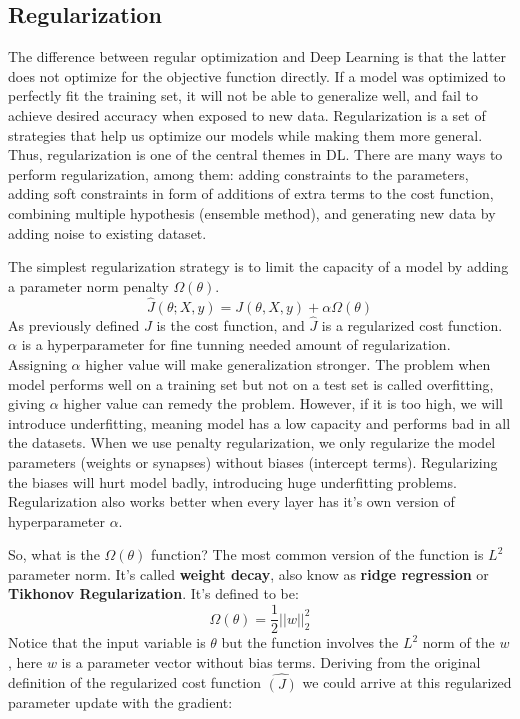 \documentclass[paper=a4, fontsize=11pt]{scrartcl}
\numberwithin{equation}{section}		%
\numberwithin{figure}{section}			%
\numberwithin{table}{section}			%
\begin{document}
	\subsection{Regularization}
	The difference between regular optimization and Deep Learning is that the latter does not optimize for the objective function directly. If a model was optimized to perfectly fit the training set, it will not be able to generalize well, and fail to achieve desired accuracy when exposed to new data. Regularization is a set of strategies that help us optimize our models while making them more general. Thus, regularization is one of the central themes in DL. There are many ways to perform regularization, among them: adding constraints to the parameters, adding soft constraints in form of additions of extra terms to the cost function, combining multiple hypothesis (ensemble method), and generating new data by adding noise to existing dataset.
	\par
	The simplest regularization strategy is to limit the capacity of a model by adding a parameter norm penalty $ \Omega(\theta) $.
	$$ 
	\hat{J}(\theta;X,y) = J(\theta,X,y) + \alpha\Omega(\theta) 
	$$ 
	As previously defined $J$ is the cost function, and $\hat{J}$ is a regularized cost function. $\alpha$ is a hyperparameter for fine tunning needed amount of regularization. Assigning $\alpha$ higher value will make generalization stronger. The problem when model performs well on a training set but not on a test set is called overfitting, giving $\alpha$ higher value can remedy the problem. However, if it is too high, we will introduce underfitting, meaning model has a low capacity and performs bad in all the datasets. When we use penalty regularization, we only regularize the model  parameters (weights or synapses) without biases (intercept terms). Regularizing the biases will hurt model badly, introducing huge underfitting problems. Regularization also works better when every layer has it's own version of hyperparameter $\alpha$. \par
	So, what is the $\Omega(\theta)$ function? The most common version of the function is $L^2$ parameter norm. It's called \textbf{weight decay}, also know as \textbf{ridge regression} or \textbf{Tikhonov Regularization}. It's defined to be:
	$$ 
	\Omega(\theta) = \frac{1}{2}||w||_2^2
	$$
	Notice that the input variable is $\theta$ but the function involves the $L^2$ norm of the $w$, here $w$ is a parameter vector without bias terms. Deriving from the original definition of the regularized cost function $\hat{(J)}$ we could arrive at this regularized parameter update with the gradient:
\end{document}
